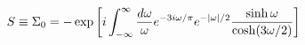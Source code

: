 \begin{equation}
S\equiv\Sigma_0=-\exp\left[i\int_{-\infty}^\infty
  {d\omega\over\omega}e^{-3i\omega/\pi}e^{-|\omega|/2}
  {\sinh\omega\over\cosh(3\omega/2)}\right]\label{sigma0elt}
\end{equation}

